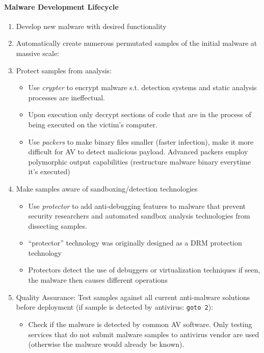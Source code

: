\paragraph{Malware Development Lifecycle}
\begin{enumerate}
	\item Develop new malware with desired functionality
	\item Automatically create numerous permutated samples of the initial malware at massive scale:
	\item Protect samples from analysis:
	\begin{itemize}
		\item Use \textit{crypter} to encrypt malware s.t. detection systems and static analysis processes are ineffectual.
		\item Upon execution only decrypt sections of code that are in the process of being executed on the victim’s computer.
		\item Use \textit{packers} to make binary files smaller (faster infection), make it more difficult for AV to detect malicious payload. Advanced packers employ polymorphic output capabilities (restructure malware binary everytime it's executed)
	\end{itemize}
	\item Make samples aware of sandboxing/detection technologies
	\begin{itemize}
		\item Use \textit{protector} to add anti-debugging features to malware that prevent security researchers and automated sandbox analysis technologies from dissecting samples.
		\item “protector” technology was originally designed as a DRM protection technology
		\item Protectors detect the use of debuggers or virtualization techniques if seen, the malware then causes different operations
	\end{itemize}
	\item Quality Assurance: Test samples against all current anti-malware solutions before deployment (if sample is detected by antivirus: \texttt{goto 2}):
	\begin{itemize}
		\item Check if the malware is detected by common AV software. Only testing services that do not submit malware samples to antivirus vendor are used (otherwise the malware would already be known).
	\end{itemize}
\end{enumerate}

